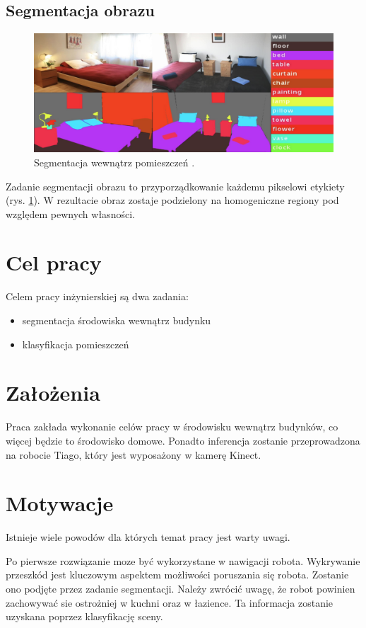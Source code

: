 \subsection{Segmentacja obrazu}
\begin{figure}
    \includegraphics[width=\textwidth]{images/segment.png}
    \caption{Segmentacja wewnątrz pomieszczeń \cite{zhang2018context}.}
    \label{fig:segment}
  \end{figure}

Zadanie segmentacji obrazu to przyporządkowanie każdemu pikselowi etykiety (rys. \ref{fig:segment}). W rezultacie obraz zostaje podzielony na homogeniczne regiony pod względem pewnych własności.

\section{Cel pracy}
Celem pracy inżynierskiej są dwa zadania:
\begin{itemize}
    \item segmentacja środowiska wewnątrz budynku
    \item klasyfikacja pomieszczeń
\end{itemize}
\section{Założenia}
Praca zakłada wykonanie celów pracy w środowisku wewnątrz budynków, co więcej będzie to środowisko domowe. Ponadto inferencja zostanie przeprowadzona na robocie Tiago, który jest wyposażony w kamerę Kinect.
\section{Motywacje}
Istnieje wiele powodów dla których temat pracy jest warty uwagi.

Po pierwsze rozwiązanie moze być wykorzystane w nawigacji robota. Wykrywanie przeszkód jest kluczowym aspektem możliwości poruszania się robota. Zostanie ono podjęte przez zadanie segmentacji. Należy zwrócić uwagę, że robot powinien zachowywać sie ostrożniej w kuchni oraz w łazience. Ta informacja zostanie uzyskana poprzez klasyfikację sceny.

